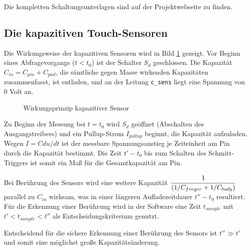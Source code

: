 \documentclass{clt2012}
\renewcommand{\figurename}{Bild}
\begin{document}
Die kompletten Schaltungsunterlagen sind auf der Projektwebseite zu finden.

\subsection*{Die kapazitiven Touch-Sensoren}

Die Wirkungsweise der kapazitiven Sensoren wird in \figurename{} \ref{fig:capsense} gezeigt. Vor Beginn eines Abfragevorgangs
($t < t_0$) ist der Schalter $S_d$ geschlossen. Die Kapazität $C_{in}=C_{pin} + C_{pad}$, die sämtliche gegen Masse wirkenden Kapazitäten zusammenfasst, ist entladen, und an der Leitung \texttt{c\_sens} liegt eine Spannung von 0 Volt an.

\begin{figure}[hb]
\centering
{}
\caption{Wirkungsprinzip kapazitiver Sensor}
\label{fig:capsense}
\end{figure}

Zu Beginn der Messung bei $t = t_0$ wird $S_d$ geöffnet (Abschalten des Ausgangstreibers) und ein Pullup-Strom
$I_{pullup}$ beginnt, die Kapazität aufzuladen. Wegen $I = C du/dt$ ist der messbare Spannungsanstieg je Zeiteinheit am Pin durch die Kapazität bestimmt. Die Zeit $t'-t_0$ bis zum Schalten des Schmitt-Triggers ist somit ein Maß für die Gesamtkapazität am Pin.

Bei Berührung des Sensors wird eine weitere Kapazität  $\cfrac{1}{(1/C_{finger} + 1/C_{body})}$ parallel zu $C_{in}$ 
wirksam, was in einer längeren Aufladezeitdauer $t''-t_0$ resultiert. Für die Erkennung einer Berührung wird in der Software eine Zeit $t_{sample}$ mit $t' < t_{sample} < t''$ als Entscheidungskriterium genutzt.

Entscheidend für die sichere Erkennung einer Berührung des Sensors ist $t'' \gg t'$ und somit eine möglichst große Kapazitätsänderung. 
\end{document}

